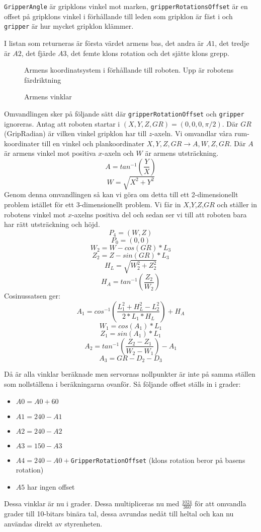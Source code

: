 \texttt{GripperAngle} är gripklons vinkel mot marken, \texttt{gripperRotationsOffset} är en offset på gripklons vinkel i förhållande till leden som gripklon är fäst i och \texttt{gripper} är hur mycket gripklon klämmer.

I listan som returneras är första värdet armens bas, det andra är $A1$, det tredje är $A2$, det fjärde $A3$, det femte klons rotation och det sjätte klons grepp.

\begin{figure}[h!]
	\centerline{}
	\caption{Armens koordinatsystem i förhållande till roboten. Upp är robotens färdriktning}
\end{figure}

\begin{figure}[h!]
	\centerline{}
	\caption{Armens vinklar}
\end{figure}

Omvandlingen sker på följande sätt där \texttt{gripperRotationOffset} och \texttt{gripper} ignoreras. Antag att roboten startar i $(X,Y,Z,GR)=(0,0,0,\pi/2)$.
Där $GR$(GripRadian) är vilken vinkel gripklon har till $z$-axeln.\newline
Vi omvandlar våra rum-koordinater till en vinkel och plankoordinater $X,Y,Z,GR\rightarrow A,W,Z,GR$. Där $A$ är armens vinkel mot positiva $x$-axeln och $W$ är armens utsträckning.
$$A=tan^{-1}(\dfrac{Y}{X}) $$
$$W=\sqrt{X^2+Y^2}$$
Genom denna omvandlingen så kan vi göra om detta till ett 2-dimensionellt problem istället för ett 3-dimensionellt problem. Vi får in $X$,$Y$,$Z$,$GR$ och ställer in robotens vinkel mot $x$-axelns positiva del och sedan ser vi till att roboten bara har rätt utsträckning och höjd.
$$P_4=(W,Z)$$
$$P_0=(0,0)$$
$$W_2=W-cos(GR)*L_3$$
$$Z_2=Z-sin(GR)*L_3$$
$$H_L=\sqrt{W_2^2+Z_2^2}$$
$$H_A=tan^{-1}(\dfrac{Z_2}{W_2})$$
Cosinussatsen ger:
$$A_1=cos^{-1}(\dfrac{L_1^2+H_L^2-L_2^2}{2*L_1*H_L})+H_A$$
$$W_1=cos(A_1)*L_1$$
$$Z_1=sin(A_1)*L_1$$
$$A_2=tan^{-1}(\dfrac{Z_2-Z_1}{W_2-W_1})-A_1$$
$$A_3=GR-D_2-D_3$$

Då är alla vinklar beräknade men servornas nollpunkter är inte på samma ställen som nollställena i beräkningarna ovanför. Så följande offset ställs in i grader:

\begin{itemize}
	\item $A0=A0+60$
	\item $A1=240-A1$
	\item $A2=240-A2$
	\item $A3=150-A3$
	\item $A4=240-A0+$\texttt{GripperRotationOffset} (klons rotation beror på basens rotation)
	\item $A5$ har ingen offset
\end{itemize}

Dessa vinklar är nu i grader. Dessa multipliceras nu med $\frac{1024}{360}$ för att omvandla grader till 10-bitars binära tal, dessa avrundas nedåt till heltal och kan nu användas direkt av styrenheten.
